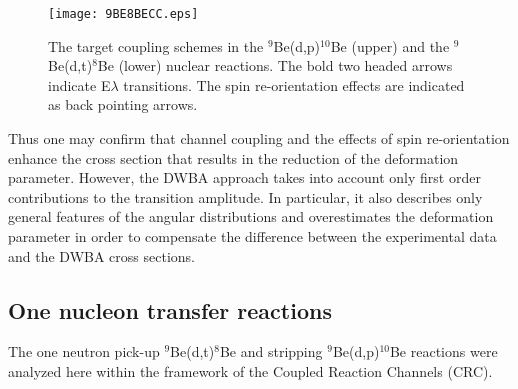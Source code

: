 \documentclass[10pt]{iopart}
\begin{document}
\begin{figure}[bp]
\centering
\texttt{[image: 9BE8BECC.eps]}
\caption{ \label{9BE8BECC} The target coupling schemes in the $^9$Be(d,p)$^{10}$Be (upper) and the $^9$Be(d,t)$^8$Be (lower) nuclear reactions. The bold two headed arrows indicate E$\lambda$ transitions. The spin re-orientation effects are indicated as back pointing arrows.}
\end{figure}	

Thus one may confirm that channel coupling and the effects of spin re-orientation enhance the cross section that results in the reduction of the deformation parameter. However, the DWBA approach takes into account only first order contributions to the transition amplitude. In particular, it also describes only general features of the angular distributions and overestimates the deformation parameter in order to compensate the difference between the experimental data and the DWBA cross sections.



\subsection{One nucleon transfer reactions }
The one neutron pick-up ${}^9$Be(d,t)${}^8$Be and stripping ${}^9$Be(d,p)${}^{10}$Be reactions were analyzed here within the framework of  the Coupled Reaction Channels (CRC).
\end{document}
